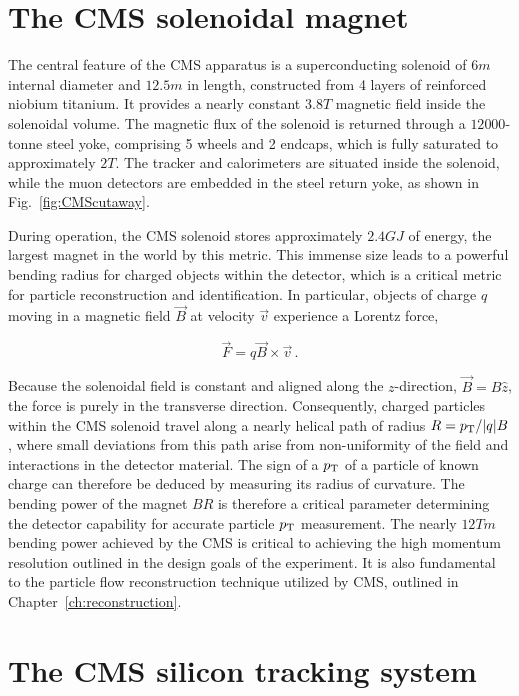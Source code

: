 \section{The CMS solenoidal magnet}

The central feature of the CMS apparatus is a superconducting solenoid 
of $6\unit{m}$ internal diameter and $12.5\unit{m}$ in length,
constructed from 4 layers of reinforced niobium titanium.
It provides a nearly constant $3.8\unit{T}$ magnetic field inside the solenoidal volume.
The magnetic flux of the solenoid is returned through
a $12 000$-tonne steel yoke, comprising 5 wheels and 2 endcaps,
which is fully saturated to approximately $2\unit{T}$. 
The tracker and calorimeters are situated inside the solenoid, while 
the muon detectors are embedded in the steel return yoke, as shown
in Fig.~\ref{fig:CMScutaway}.

During operation, the CMS solenoid stores approximately $2.4\unit{GJ}$ of 
energy, the largest magnet in the world by this metric. This immense
size leads to a powerful bending radius for charged objects within the detector,
which is a critical metric for particle reconstruction and identification.
In particular, objects of charge $q$ moving
in a magnetic field $\vec{B}$ at velocity $\vec{v}$ experience a Lorentz force,

\begin{equation}
  \vec{F} = q\vec{B} \times \vec{v} \,.
\end{equation}

Because the solenoidal field is constant and aligned along the $z$-direction, 
$\vec{B} = B\hat{z}$, the force is purely in the transverse direction.
Consequently, charged particles within the CMS
solenoid travel along a nearly helical path of radius $R=p_{\mathrm{T}}/\lvert q \rvert B$, where 
small deviations from this path arise from non-uniformity of the field
and interactions in the detector material. The sign of a 
$p_{\mathrm{T}}$ of a particle of known charge can therefore be deduced by measuring its radius of
curvature. The bending power of the magnet $BR$ is therefore a critical 
parameter determining the detector capability for accurate particle $p_{\mathrm{T}}$ measurement.
The nearly $12\unit{Tm}$ bending power achieved by the CMS is critical to achieving
the high momentum resolution outlined in the design goals of the experiment. It
is also fundamental to the particle flow reconstruction technique utilized by CMS,
outlined in Chapter~\ref{ch:reconstruction}.

\section{The CMS silicon tracking system}

